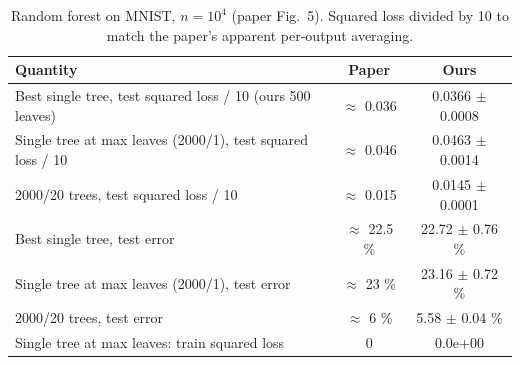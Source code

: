 \begin{table}[h]
  \centering
  \caption{Random forest on MNIST, $n = 10^4$ (paper Fig.~5). Squared loss divided by 10 to match the paper's apparent per-output averaging.}
  \begin{tabular}{lcc}
    \toprule
    Quantity & Paper & Ours \\
    \midrule
    Best single tree, test squared loss / 10 (ours 500 leaves) & $\approx$ 0.036 & 0.0366 $\pm$ 0.0008 \\
    Single tree at max leaves (2000/1), test squared loss / 10 & $\approx$ 0.046 & 0.0463 $\pm$ 0.0014 \\
    2000/20 trees, test squared loss / 10 & $\approx$ 0.015 & 0.0145 $\pm$ 0.0001 \\
    Best single tree, test error & $\approx$ 22.5 \% & 22.72 $\pm$ 0.76 \% \\
    Single tree at max leaves (2000/1), test error & $\approx$ 23 \% & 23.16 $\pm$ 0.72 \% \\
    2000/20 trees, test error & $\approx$ 6 \% & 5.58 $\pm$ 0.04 \% \\
    Single tree at max leaves: train squared loss & 0 & 0.0e+00 \\
    \bottomrule
  \end{tabular}
\end{table}
